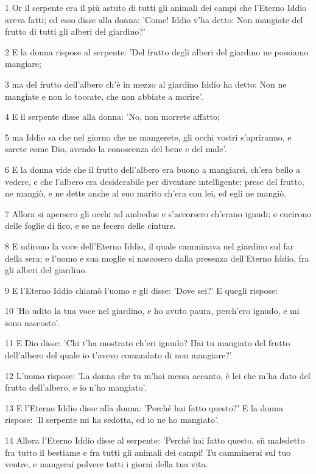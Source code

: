 \par 1 Or il serpente era il più astuto di tutti gli animali dei campi che l'Eterno Iddio aveva fatti; ed esso disse alla donna: 'Come! Iddio v'ha detto: Non mangiate del frutto di tutti gli alberi del giardino?'
\par 2 E la donna rispose al serpente: 'Del frutto degli alberi del giardino ne possiamo mangiare;
\par 3 ma del frutto dell'albero ch'è in mezzo al giardino Iddio ha detto: Non ne mangiate e non lo toccate, che non abbiate a morire'.
\par 4 E il serpente disse alla donna: 'No, non morrete affatto;
\par 5 ma Iddio sa che nel giorno che ne mangerete, gli occhi vostri s'apriranno, e sarete come Dio, avendo la conoscenza del bene e del male'.
\par 6 E la donna vide che il frutto dell'albero era buono a mangiarsi, ch'era bello a vedere, e che l'albero era desiderabile per diventare intelligente; prese del frutto, ne mangiò, e ne dette anche al suo marito ch'era con lei, ed egli ne mangiò.
\par 7 Allora si apersero gli occhi ad ambedue e s'accorsero ch'erano ignudi; e cucirono delle foglie di fico, e se ne fecero delle cinture.
\par 8 E udirono la voce dell'Eterno Iddio, il quale camminava nel giardino sul far della sera; e l'uomo e sua moglie si nascosero dalla presenza dell'Eterno Iddio, fra gli alberi del giardino.
\par 9 E l'Eterno Iddio chiamò l'uomo e gli disse: 'Dove sei?' E quegli rispose:
\par 10 'Ho udito la tua voce nel giardino, e ho avuto paura, perch'ero ignudo, e mi sono nascosto'.
\par 11 E Dio disse: 'Chi t'ha mostrato ch'eri ignudo? Hai tu mangiato del frutto dell'albero del quale io t'avevo comandato di non mangiare?'
\par 12 L'uomo rispose: 'La donna che tu m'hai messa accanto, è lei che m'ha dato del frutto dell'albero, e io n'ho mangiato'.
\par 13 E l'Eterno Iddio disse alla donna: 'Perché hai fatto questo?' E la donna rispose: 'Il serpente mi ha sedotta, ed io ne ho mangiato'.
\par 14 Allora l'Eterno Iddio disse al serpente: 'Perché hai fatto questo, sii maledetto fra tutto il bestiame e fra tutti gli animali dei campi! Tu camminerai sul tuo ventre, e mangerai polvere tutti i giorni della tua vita.
